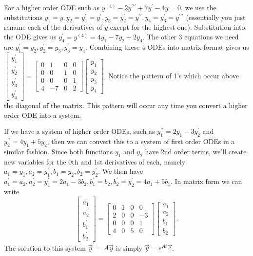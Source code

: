 For a higher order ODE such as $y^{(4)}-2y^{\prime\prime\prime}+7y^\prime -4y=0$, we use the substitutions $y_1=y, y_2=y_1^\prime=y^\prime, y_3=y_2^\prime=y^{\prime\prime}, y_4=y_3^\prime=y^{\prime\prime\prime}$ (essentially you just rename each of the derivatives of $y$ except for the highest one).  Substitution into the ODE gives us $y_4^\prime =y^{(4)}= 4y_1-7y_2+2y_4$.  The other 3 equations we need are $y_1^\prime = y_2,y_2^\prime = y_3,y_3^\prime = y_4.$ Combining these 4 ODEs into matrix format gives us
$
\begin{bmatrix}
y_1^\prime\\
y_2^\prime\\
y_3^\prime\\
y_4^\prime
\end{bmatrix}
=
\begin{bmatrix}
0&1&0&0\\
0&0&1&0\\
0&0&0&1\\
4&-7&0&2
\end{bmatrix}
\begin{bmatrix}
y_1\\
y_2\\
y_3\\
y_4
\end{bmatrix}
$. Notice the pattern of 1's which occur above the diagonal of the matrix.  This pattern will occur any time you convert a higher order ODE into a system.

If we have a system of higher order ODEs, such as $y_1^{\prime\prime} = 2y_1-3y_2^\prime$ and $y_2^{\prime\prime}= 4y_1+5y_2$, then we can convert this to a system of first order ODEs in a similar fashion.  Since both functions $y_1$ and $y_2$ have 2nd order terms, we'll create new variables for the 0th and 1st derivatives of each, namely $a_1 = y_1, a_2=y_1^\prime, b_1=y_2, b_2=y_2^\prime$. We then have $a_1^\prime = a_2, a_2^\prime = y_1^\prime = 2a_1-3b_2, b_1^\prime = b_2, b_2^\prime = y_2^\prime = 4a_1+5b_1$.  In matrix form we can write 
$$
\begin{bmatrix}
a_1^\prime\\
a_2^\prime\\
b_1^\prime\\
b_2^\prime
\end{bmatrix}
=
\begin{bmatrix}
0&1&0&0\\
2&0&0&-3\\
0&0&0&1\\
4&0&5&0
\end{bmatrix}
\begin{bmatrix}
a_1\\
a_2\\
b_1\\
b_2
\end{bmatrix}.
$$  
The solution to this system $\vec y^\prime = A\vec y$ is simply $\vec y = e^{At}\vec c$. 


